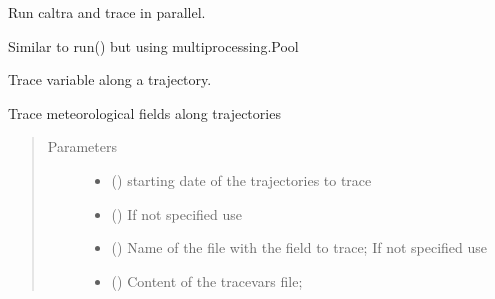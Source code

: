 \documentclass[a4paper,10pt,english]{sphinxmanual}
\begin{document}
\begin{fulllineitems}
\begin{fulllineitems}
\end{fulllineitems}


\begin{fulllineitems}
\label{\detokenize{lagranto:lagranto.LagrantoRun.run_parallel}}
Run caltra and trace in parallel.

Similar to run() but using multiprocessing.Pool

\end{fulllineitems}


\begin{fulllineitems}
\label{\detokenize{lagranto:lagranto.LagrantoRun.trace}}
Trace variable along a trajectory.

Trace meteorological fields along trajectories
\begin{quote}\begin{description}
\item[{Parameters}] \leavevmode\begin{itemize}
\item {} 
 () \textendash{} starting date of the trajectories to trace

\item {} 
 (\sphinxstyleliteralemphasis{, }) \textendash{} If not specified use 

\item {} 
 (\sphinxstyleliteralemphasis{, }) \textendash{} Name of the file with the field to trace;
If not specified use 

\item {} 
 (\sphinxstyleliteralemphasis{, }) \textendash{} 
Content of the tracevars file;


\end{itemize}
\end{description}
\end{quote}
\end{fulllineitems}
\end{fulllineitems}
\end{document}
